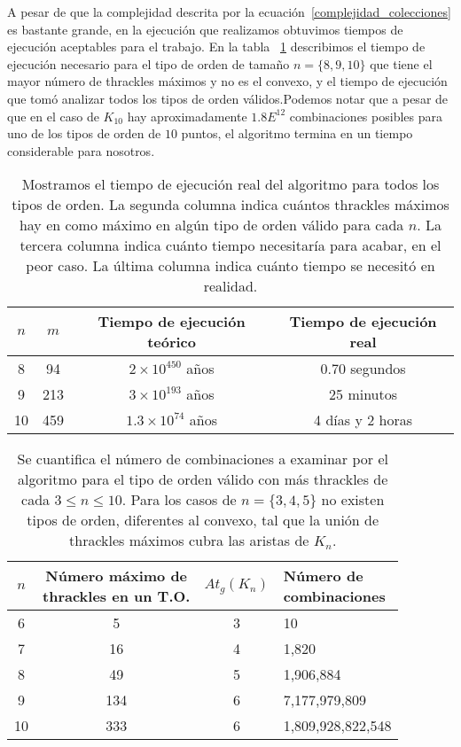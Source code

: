   A pesar de que la complejidad descrita por la ecuación~\ref{complejidad_colecciones} es bastante
  grande, en la ejecución que realizamos obtuvimos tiempos de ejecución aceptables para el trabajo.
  En la tabla ~\ref{tabla:tiempo_colecciones_thrackles} describimos el tiempo de ejecución
  necesario para el tipo de orden de tamaño $n=\{8,9,10\}$ que tiene el mayor número de thrackles
  máximos y no es el convexo, y el tiempo de ejecución que tomó analizar todos los tipos de orden
  válidos.Podemos notar que a pesar de que en el caso de $K_{10}$ hay aproximadamente $1.8E^{12}$
  combinaciones posibles para uno de los tipos de orden de $10$ puntos, el algoritmo termina en un
  tiempo considerable para nosotros.

  \begin{table}
    \begin{tabular}{|c|c|c|c|}
      \hline
      $n$ & $m$ & Tiempo de ejecución teórico & Tiempo de ejecución real \\ \hline
      8   & 94  &  $2\times 10^{450}$ años    &  0.70 segundos           \\ \hline
      9   & 213 &  $3\times 10^{193}$ años    &  25 minutos               \\ \hline
      10  & 459 &  $1.3 \times 10^{74}$ años  &  4 días y 2 horas          \\ \hline
    \end{tabular}
    \caption{Mostramos el tiempo de ejecución real del algoritmo para todos los tipos de orden. La segunda columna indica cuántos thrackles máximos hay en como máximo en algún tipo de orden válido para cada $n$. La tercera columna indica cuánto tiempo necesitaría para acabar, en el peor caso. La última columna indica cuánto tiempo se necesitó en realidad.}
    \label{tabla:tiempo_colecciones_thrackles}
  \end{table}

  \begin{table}[t]
    \centering
    \begin{tabular}{|c|c|c|l|}
      \hline
      $n$ & \makecell{Número máximo de \\ thrackles en un T.O.} &$At_g(K_n)$& \makecell{Número de \\      combinaciones} \\ \hline
      \hline
      6 & 5 & 3 & 10 \\ \hline
      7 & 16 & 4 & 1,820 \\\hline
      8 & 49 & 5 & 1,906,884 \\\hline
      9 & 134 & 6 & 7,177,979,809 \\\hline
      10 & 333 & 6 & 1,809,928,822,548 \\ \hline
    \end{tabular}
    \caption{Se cuantifica el número de combinaciones a examinar por el algoritmo para el
    tipo de orden válido con más thrackles de cada $ 3 \leq n \leq 10$. Para los casos de
    $n = \{3,4,5\}$ no existen tipos de orden, diferentes al convexo, tal que la unión de
    thrackles máximos cubra las aristas de $K_n$.}
    \label{tabla:numero_operaciones_thrackles_maximos}
  \end{table}

